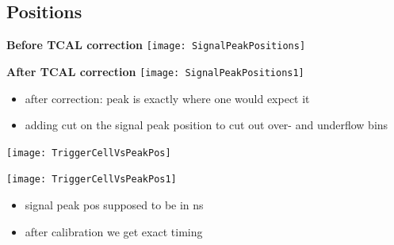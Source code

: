\documentclass[9pt]{beamer}
\begin{document}
\subsection{Positions}
\begin{frame}
	\begin{center}
		\begin{minipage}{5.5cm}
			\centering
			\textbf{Before TCAL correction}\as
			\texttt{[image: SignalPeakPositions]}
		\end{minipage}
		\hspace*{2pt}
		\begin{minipage}{5.5cm}
			\centering
			\textbf{After TCAL correction}\as
			\texttt{[image: SignalPeakPositions1]}
		\end{minipage}\no\s
	\end{center}
	\begin{itemize}
		\item after correction: peak is exactly where one would expect it
		\item adding cut on the signal peak position to cut out over- and underflow bins
	\end{itemize}
\end{frame}
\begin{frame}
	\begin{center}
		\begin{minipage}{5.5cm}
			\centering
			\texttt{[image: TriggerCellVsPeakPos]}
		\end{minipage}
		\hspace*{2pt}
		\begin{minipage}{5.5cm}
			\centering
			\texttt{[image: TriggerCellVsPeakPos1]}
		\end{minipage}\no\s
	\end{center}
	\begin{itemize}
		\item signal peak pos supposed to be in ns
		\item after calibration we get exact timing
	\end{itemize}
\end{frame}
\end{document}
